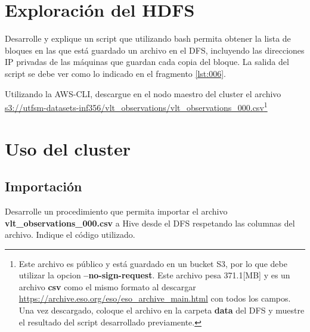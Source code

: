 \documentclass[12pt,letterpaper,twoside]{article}
\begin{document}
\begin{code}[H]

\end{code}

\begin{code}[H]

\end{code}

\section{Exploración del HDFS}

{\color{red} Desarrolle y explique un script que utilizando bash permita obtener la lista de bloques en las que está guardado un archivo en el DFS, incluyendo las direcciones IP privadas de las máquinas que guardan cada copia del bloque. La salida del script se debe ver como lo indicado en el fragmento \ref{lst:006}.}

\begin{code}[H]

\end{code}

{\color{red} Utilizando la AWS-CLI, descargue en el nodo maestro del cluster el archivo \url{s3://utfsm-datasets-inf356/vlt_observations/vlt_observations_000.csv}}\footnote{Este archivo es público y está guardado en un bucket S3, por lo que debe utilizar la opcion \textbf{--no-sign-request}. Este archivo pesa 371.1[MB] y es un archivo \textbf{csv} como el mismo formato al descargar \url{https://archive.eso.org/eso/eso_archive_main.html} con todos los campos. Una vez descargado, coloque el archivo en la carpeta \textbf{data} del DFS y muestre el resultado del script desarrollado previamente.}

\section{Uso del cluster}

\subsection{Importación}

{\color{red} Desarrolle un procedimiento que permita importar el archivo \textbf{vlt\_observations\_000.csv} a Hive desde el DFS respetando las columnas del archivo. Indique el código utilizado.}
\end{document}

